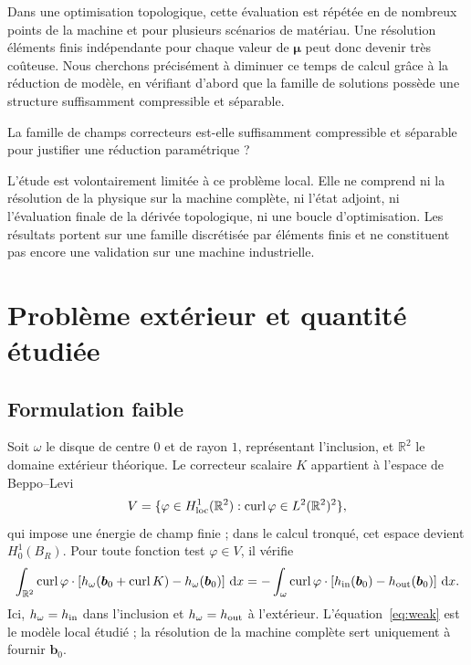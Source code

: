 \documentclass[10pt,a4paper]{article}
\newcommand{\curl}{\operatorname{curl}}
\newcommand{\R}{\mathbb{R}}
\newcommand{\dd}{\,\mathrm d}
\newcommand{\resultbox}[1]{\begin{center}\colorbox{lightteal}{\parbox{.94\linewidth}{\small #1}}\end{center}}
\begin{document}
Dans une optimisation topologique, cette évaluation est répétée en de nombreux points de la machine et pour plusieurs scénarios de matériau. Une résolution éléments finis indépendante pour chaque valeur de $\bm\mu$ peut donc devenir très coûteuse. Nous cherchons précisément à diminuer ce temps de calcul grâce à la réduction de modèle, en vérifiant d'abord que la famille de solutions possède une structure suffisamment compressible et séparable.

\resultbox{La famille de champs correcteurs est-elle suffisamment compressible et séparable pour justifier une réduction paramétrique ?}

L'étude est volontairement limitée à ce problème local. Elle ne comprend ni la résolution de la physique sur la machine complète, ni l'état adjoint, ni l'évaluation finale de la dérivée topologique, ni une boucle d'optimisation. Les résultats portent sur une famille discrétisée par éléments finis et ne constituent pas encore une validation sur une machine industrielle.

\section{Problème extérieur et quantité étudiée}
\subsection{Formulation faible}
Soit $\omega$ le disque de centre $0$ et de rayon $1$, représentant l'inclusion, et $\R^2$ le domaine extérieur théorique. Le correcteur scalaire $K$ appartient à l'espace de Beppo--Levi
\[
V=\{\varphi\in H^1_{\rm loc}(\R^2):\curl\varphi\in L^2(\R^2)^2\},
\]
qui impose une énergie de champ finie ; dans le calcul tronqué, cet espace devient $H^1_0(B_R)$. Pour toute fonction test $\varphi\in V$, il vérifie
\begin{equation}\label{eq:weak}
\int_{\R^2}\curl\varphi\cdot\left[h_\omega(\bm b_0+\curl K)-h_\omega(\bm b_0)\right]\dd x
=-\int_\omega\curl\varphi\cdot\left[h_{\rm in}(\bm b_0)-h_{\rm out}(\bm b_0)\right]\dd x .
\end{equation}
Ici, $h_\omega=h_{\rm in}$ dans l'inclusion et $h_\omega=h_{\rm out}$ à l'extérieur. L'équation~\eqref{eq:weak} est le modèle local étudié ; la résolution de la machine complète sert uniquement à fournir $\bm b_0$.
\end{document}
